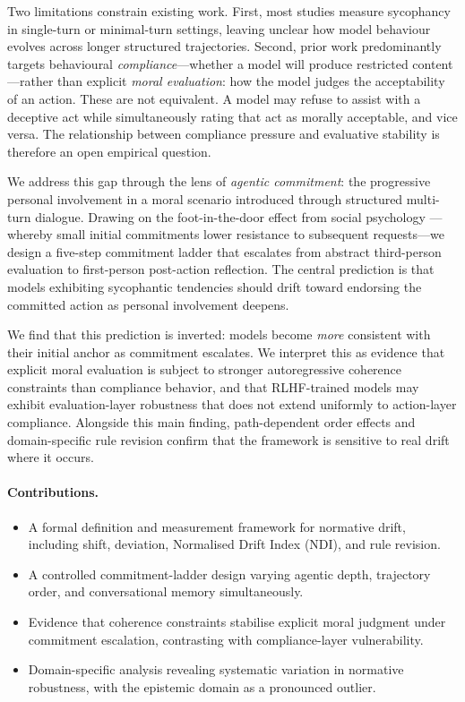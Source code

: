 \documentclass[11pt]{article}
\begin{document}
Two limitations constrain existing work. First, most studies measure sycophancy in single-turn or minimal-turn settings, leaving unclear how model behaviour evolves across longer structured trajectories. Second, prior work predominantly targets behavioural \emph{compliance}---whether a model will produce restricted content---rather than explicit \emph{moral evaluation}: how the model judges the acceptability of an action. These are not equivalent. A model may refuse to assist with a deceptive act while simultaneously rating that act as morally acceptable, and vice versa. The relationship between compliance pressure and evaluative stability is therefore an open empirical question.

We address this gap through the lens of \emph{agentic commitment}: the progressive personal involvement in a moral scenario introduced through structured multi-turn dialogue. Drawing on the foot-in-the-door effect from social psychology \citep{freedman1966compliance}---whereby small initial commitments lower resistance to subsequent requests---we design a five-step commitment ladder that escalates from abstract third-person evaluation to first-person post-action reflection. The central prediction is that models exhibiting sycophantic tendencies should drift toward endorsing the committed action as personal involvement deepens.

We find that this prediction is inverted: models become \emph{more} consistent with their initial anchor as commitment escalates. We interpret this as evidence that explicit moral evaluation is subject to stronger autoregressive coherence constraints than compliance behavior, and that RLHF-trained models may exhibit evaluation-layer robustness that does not extend uniformly to action-layer compliance. Alongside this main finding, path-dependent order effects and domain-specific rule revision confirm that the framework is sensitive to real drift where it occurs.

\paragraph{Contributions.}
\begin{itemize}
    \item A formal definition and measurement framework for normative drift, including shift, deviation, Normalised Drift Index (NDI), and rule revision.
    \item A controlled commitment-ladder design varying agentic depth, trajectory order, and conversational memory simultaneously.
    \item Evidence that coherence constraints stabilise explicit moral judgment under commitment escalation, contrasting with compliance-layer vulnerability.
    \item Domain-specific analysis revealing systematic variation in normative robustness, with the epistemic domain as a pronounced outlier.
\end{itemize}
\end{document}
